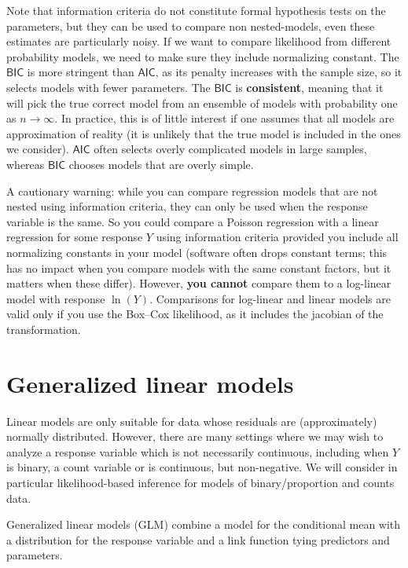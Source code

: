 \documentclass[
  11pt,
  letterpaper,
]{book}
\theoremstyle{definition}
\theoremstyle{definition}
\theoremstyle{definition}
\theoremstyle{definition}
\theoremstyle{remark}
\begin{document}
Note that information criteria do not constitute formal hypothesis tests on the parameters, but they can be used to compare non nested-models, even these estimates are particularly noisy. If we want to compare likelihood from different probability models, we need to make sure they include normalizing constant. The \(\mathsf{BIC}\) is more stringent than \(\mathsf{AIC}\), as its penalty increases with the sample size, so it selects models with fewer parameters. The \(\mathsf{BIC}\) is \textbf{consistent}, meaning that it will pick the true correct model from an ensemble of models with probability one as \(n \to \infty\). In practice, this is of little interest if one assumes that all models are approximation of reality (it is unlikely that the true model is included in the ones we consider). \(\mathsf{AIC}\) often selects overly complicated models in large samples, whereas \(\mathsf{BIC}\) chooses models that are overly simple.

A cautionary warning: while you can compare regression models that are not nested using information criteria, they can only be used when the response variable is the same. So you could compare a Poisson regression with a linear regression for some response \(Y\) using information criteria provided you include all normalizing constants in your model (software often drops constant terms; this has no impact when you compare models with the same constant factors, but it matters when these differ). However, \textbf{you cannot} compare them to a log-linear model with response \(\ln(Y)\). Comparisons for log-linear and linear models are valid only if you use the Box--Cox likelihood, as it includes the jacobian of the transformation.

\hypertarget{generalized-linear-models}{%
\chapter{Generalized linear models}\label{generalized-linear-models}}

Linear models are only suitable for data whose residuals are (approximately)
normally distributed. However, there are many settings where we may wish
to analyze a response variable which is not necessarily continuous,
including when \(Y\) is binary, a count variable or is continuous, but
non-negative. We will consider in particular likelihood-based inference
for models of binary/proportion and counts data.

Generalized linear models (GLM) combine a model for the conditional mean
with a distribution for the response variable and a link function tying
predictors and parameters.
\end{document}

